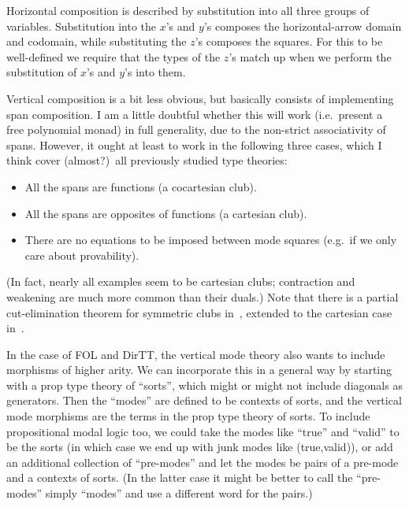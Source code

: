 \documentclass{article}
\theoremstyle{definition}
\theoremstyle{remark}
\begin{document}
Horizontal composition is described by substitution into all three groups of variables.
Substitution into the $x$'s and $y$'s composes the horizontal-arrow domain and codomain, while substituting the $z$'s composes the squares.
For this to be well-defined we require that the types of the $z$'s match up when we perform the substitution of $x$'s and $y$'s into them.

Vertical composition is a bit less obvious, but basically consists of implementing span composition.
I am a little doubtful whether this will work (i.e.\ present a free polynomial monad) in full generality, due to the non-strict associativity of spans.
However, it ought at least to work in the following three cases, which I think cover (almost?)\ all previously studied type theories:
\begin{itemize}
\item All the spans are functions (a cocartesian club).
\item All the spans are opposites of functions (a cartesian club).
\item There are no equations to be imposed between mode squares (e.g.\ if we only care about provability).
\end{itemize}
(In fact, nearly all examples seem to be cartesian clubs; contraction and weakening are much more common than their duals.)
Note that there is a partial cut-elimination theorem for symmetric clubs in~\cite{kelly:mv-funct-calc}, extended to the cartesian case in~\cite{kelly:club-doc}.

In the case of FOL and DirTT, the vertical mode theory also wants to include morphisms of higher arity.
We can incorporate this in a general way by starting with a prop type theory of ``sorts'', which might or might not include diagonals as generators.
Then the ``modes'' are defined to be contexts of sorts, and the vertical mode morphisms are the terms in the prop type theory of sorts.
To include propositional modal logic too, we could take the modes like ``true'' and ``valid'' to be the sorts (in which case we end up with junk modes like (true,valid)), or add an additional collection of ``pre-modes'' and let the modes be pairs of a pre-mode and a contexts of sorts.
(In the latter case it might be better to call the ``pre-modes'' simply ``modes'' and use a different word for the pairs.)
\end{document}
